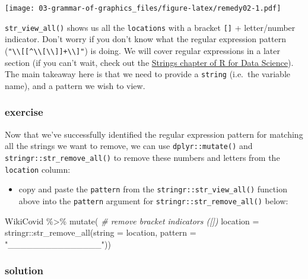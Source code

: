 \documentclass[11pt,]{article}
\newenvironment{Shaded}{\begin{snugshade}}{\end{snugshade}}
\newcommand{\AttributeTok}[1]{\textcolor[rgb]{0.77,0.63,0.00}{#1}}
\newcommand{\CommentTok}[1]{\textcolor[rgb]{0.56,0.35,0.01}{\textit{#1}}}
\newcommand{\FunctionTok}[1]{\textcolor[rgb]{0.00,0.00,0.00}{#1}}
\newcommand{\NormalTok}[1]{#1}
\newcommand{\SpecialCharTok}[1]{\textcolor[rgb]{0.00,0.00,0.00}{#1}}
\newcommand{\StringTok}[1]{\textcolor[rgb]{0.31,0.60,0.02}{#1}}
\let\oldShaded\Shaded
\let\endoldShaded\endShaded
\renewenvironment{Shaded}{\footnotesize\oldShaded}{\endoldShaded}
\def\tightlist{}
\begin{document}
\texttt{[image: 03-grammar-of-graphics\_files/figure-latex/remedy02-1.pdf]}

\texttt{str\_view\_all()} shows us all the \texttt{locations} with a
bracket \texttt{{[}{]}} + letter/number indicator. Don't worry if you
don't know what the regular expression pattern
(\texttt{"\textbackslash{}\textbackslash{}{[}{[}\^{}\textbackslash{}\textbackslash{}{[}\textbackslash{}\textbackslash{}{]}{]}+\textbackslash{}\textbackslash{}{]}"})
is doing. We will cover regular expressions in a later section (if you
can't wait, check out the
\href{https://r4ds.had.co.nz/strings.html}{Strings chapter of R for Data
Science}). The main takeaway here is that we need to provide a
\texttt{string} (i.e.~the variable name), and a pattern we wish to view.

\hypertarget{exercise-3}{%
\subsubsection{exercise}\label{exercise-3}}

Now that we've successfully identified the regular expression pattern
for matching all the strings we want to remove, we can use
\texttt{dplyr::mutate()} and \texttt{stringr::str\_remove\_all()} to
remove these numbers and letters from the \texttt{location} column:

\begin{itemize}
\tightlist
\item
  copy and paste the \texttt{pattern} from the
  \texttt{stringr::str\_view\_all()} function above into the
  \texttt{pattern} argument for \texttt{stringr::str\_remove\_all()}
  below:
\end{itemize}

\begin{Shaded}
\begin{Highlighting}[]
\NormalTok{WikiCovid }\SpecialCharTok{\%\textgreater{}\%}
  \FunctionTok{mutate}\NormalTok{(}
    \CommentTok{\# remove bracket indicators ([])}
    \AttributeTok{location =}\NormalTok{ stringr}\SpecialCharTok{::}\FunctionTok{str\_remove\_all}\NormalTok{(}\AttributeTok{string =}\NormalTok{ location, }
                                       \AttributeTok{pattern =} \StringTok{"\_\_\_\_\_\_\_\_\_\_\_\_\_\_\_"}\NormalTok{))}
\end{Highlighting}
\end{Shaded}

\hypertarget{solution-3}{%
\subsubsection{solution}\label{solution-3}}
\end{document}
